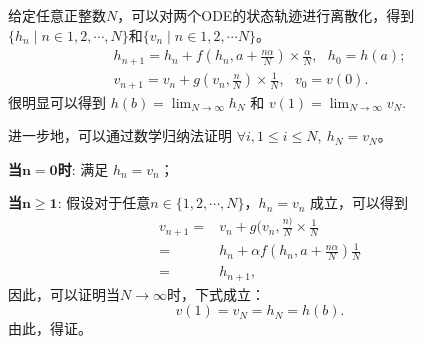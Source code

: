 给定任意正整数$N$，可以对两个ODE的状态轨迹进行离散化，得到$\{h_n\mid n\in{1,2,\cdots, N}\}$和$\{v_n\mid n\in{1,2,\cdots N}\}$。
\begin{equation}
    \begin{aligned}
    h_{n+1} = h_{n}+f(h_{n}, a+\frac{n\alpha}{N})\times \frac{\alpha}{N}, \text{ } h_0=h(a);\\
    v_{n+1} = v_{n}+g(v_{n}, \frac{n}{N})\times \frac{1}{N}, \text{ } v_0=v(0).
    \end{aligned}
\end{equation}
很明显可以得到 $h(b)=\lim_{N\to\infty}h_N$ 和 $v(1)=\lim_{N\to\infty}v_N$. 

进一步地，可以通过数学归纳法证明 $\forall i, 1 \leq i \leq N, \ h_N = v_N$。

\textbf{当$\mathbf{n=0}$时}: 满足 $h_n=v_n$；

\textbf{当$\mathbf{n\geq 1}$}: 假设对于任意$n\in\{1,2,\cdots,N\}$，$h_n=v_n$ 成立，可以得到
\begin{equation}
    \begin{aligned}
    v_{n+1} =& v_{n}+g(v_{n}, \frac{n)}{N}\times \frac{1}{N} \\
    =&h_{n}+{{\alpha}}f(h_n, a+\frac{n{\alpha}}{ N})\frac{ 1}{N} \\
    =&h_{n+1},
    \end{aligned}
\end{equation}
因此，可以证明当$N\to\infty$时，下式成立：
\begin{equation}
    v(1)=v_N=h_N=h(b).
\end{equation}
由此，得证。

